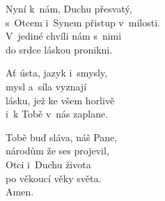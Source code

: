 \begin{translatioMulticol}{3}
Nyní k~nám, Duchu přesvatý,\\
s~Otcem i~Synem přistup v~milosti.\\
V~jediné chvíli nám s~nimi\\
do srdce láskou pronikni.\columnbreak

Ať ústa, jazyk i~smysly,\\
mysl a~síla vyznají\\
lásku, jež ke všem horlivě\\
i~k Tobě v~nás zaplane.\columnbreak

Tobě buď sláva, náš Pane,\\
národům že ses projevil,\\
Otci i~Duchu života\\
po věkoucí věky světa.\\
Amen.
\end{translatioMulticol}
